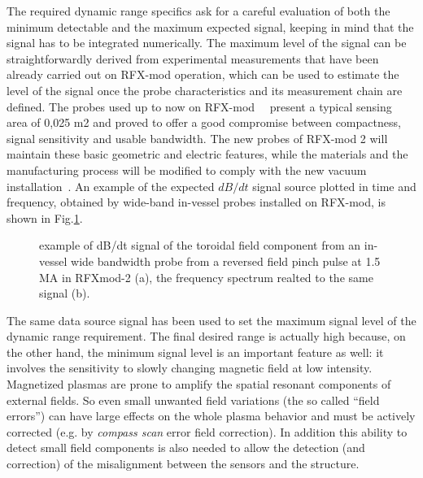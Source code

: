 The required dynamic range specifics ask for a careful evaluation of both the minimum detectable and the maximum expected signal, keeping in mind that the signal has to be integrated numerically.  
The maximum level of the signal can be straightforwardly derived from experimental measurements that have been already carried out on RFX-mod operation, which can be used to estimate the level of the signal once the probe characteristics and its measurement chain are defined. 
The probes used up to now on RFX-mod~\cite{pomaro}~\cite{pomaro2005transducers} present a typical sensing area of 0,025 m2 and proved to offer a good compromise between compactness, signal sensitivity and usable bandwidth. The new probes of RFX-mod 2 will maintain these basic geometric and electric features, while the materials and the manufacturing process will be modified to comply with the new vacuum installation~\cite{MARCHIORI2017892}. 
An example of the expected $dB/dt$ signal source plotted in time and frequency, obtained by wide-band in-vessel probes installed on RFX-mod, is shown in Fig.\ref{fig:em_signal_raw}.
%
\begin{figure}[ht]
\centering
{}
\caption{example of dB/dt signal of the toroidal field component from an in-vessel wide bandwidth probe from a reversed field pinch pulse at 1.5 MA in RFXmod-2 (a), the frequency spectrum realted to the same signal (b).}
\label{fig:em_signal_raw}
\end{figure}
%
The same data source signal has been used to set the maximum signal level of the dynamic range requirement.
The final desired range is actually high because, on the other hand, the minimum signal level is an important feature as well: it involves the sensitivity to slowly changing magnetic field at low intensity. 
Magnetized plasmas are prone to amplify the spatial resonant components of external fields. So even small unwanted field variations (the so called “field errors”) can have large effects on the whole plasma behavior and must be actively corrected (e.g. by \textit{compass scan} error field correction).
In addition this ability to detect small field components is also needed to allow the detection (and correction) of the misalignment between the sensors and the structure. 

